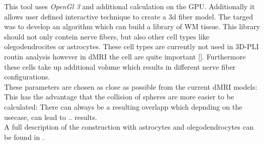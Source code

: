 This tool uses \textit{OpenGl 3} and additional calculation on the GPU.
Additionally it allows user defined interactive technique to create a 3d fiber model.
The targed was to develop an algorithm which can build a library of \ac{WM} tissue.
This library should not only contein nerve fibers, but also other cell types like olegodendrocites or astrocytes.
These cell types are currently not used in \ac{3D-PLI} routin analysis however in \ac{dMRI} the cell are quite important [\dummy].
Furthermore these cells take up additional volume which results in different nerve fiber configurations.\\
These parameters are chosen as close as possible from the current \ac{dMRI} models:
This has the advantage that the collision of spheres are more easier to be calculated:
There can always be a resulting overlapp which depnding on the usecase, can lead to .. results.\\
A full description of the construction with astrocytes and olegodendrocytes can be found in \cite{Ginsburger2019}.
